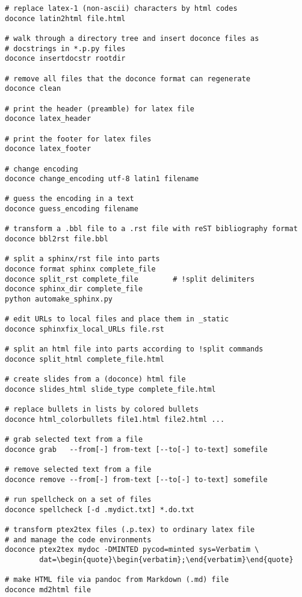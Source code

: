 \documentclass[%
oneside,                 %
final,                   %
10pt]{article}
\begin{document}
\begin{Verbatim}[numbers=none,fontsize=\fontsize{9pt}{9pt},baselinestretch=0.85,xleftmargin=0mm]
# replace latex-1 (non-ascii) characters by html codes
doconce latin2html file.html

# walk through a directory tree and insert doconce files as
# docstrings in *.p.py files
doconce insertdocstr rootdir

# remove all files that the doconce format can regenerate
doconce clean

# print the header (preamble) for latex file
doconce latex_header

# print the footer for latex files
doconce latex_footer

# change encoding
doconce change_encoding utf-8 latin1 filename

# guess the encoding in a text
doconce guess_encoding filename

# transform a .bbl file to a .rst file with reST bibliography format
doconce bbl2rst file.bbl

# split a sphinx/rst file into parts
doconce format sphinx complete_file
doconce split_rst complete_file        # !split delimiters
doconce sphinx_dir complete_file
python automake_sphinx.py

# edit URLs to local files and place them in _static
doconce sphinxfix_local_URLs file.rst

# split an html file into parts according to !split commands
doconce split_html complete_file.html

# create slides from a (doconce) html file
doconce slides_html slide_type complete_file.html

# replace bullets in lists by colored bullets
doconce html_colorbullets file1.html file2.html ...

# grab selected text from a file
doconce grab   --from[-] from-text [--to[-] to-text] somefile

# remove selected text from a file
doconce remove --from[-] from-text [--to[-] to-text] somefile

# run spellcheck on a set of files
doconce spellcheck [-d .mydict.txt] *.do.txt

# transform ptex2tex files (.p.tex) to ordinary latex file
# and manage the code environments
doconce ptex2tex mydoc -DMINTED pycod=minted sys=Verbatim \
        dat=\begin{quote}\begin{verbatim};\end{verbatim}\end{quote}

# make HTML file via pandoc from Markdown (.md) file
doconce md2html file


\end{Verbatim}
\end{document}
